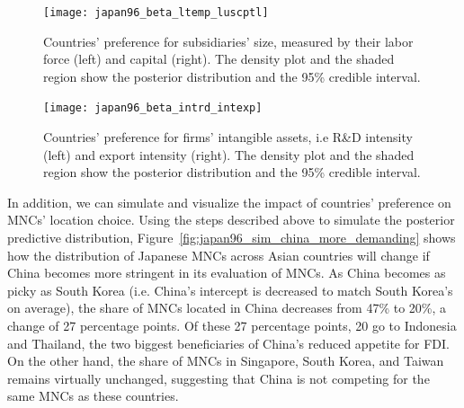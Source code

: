 \begin{figure}[tbp] \centering
  \texttt{[image: japan96\_beta\_ltemp\_luscptl]}
  \caption[Countries' preference for subsidiaries' size.]{Countries' preference
    for subsidiaries' size, measured by their labor force (left) and capital
    (right). The density plot and the shaded region show the posterior
    distribution and the 95\% credible interval.}
  \label{fig:japan96_beta_ltemp_luscptl}
\end{figure}

\begin{figure}[tbp] \centering
  \texttt{[image: japan96\_beta\_intrd\_intexp]}
  \caption[Countries' preference for firms' intangible assets.]{Countries'
    preference for firms' intangible assets, i.e R\&D intensity (left) and
    export intensity (right). The density plot and the shaded region show the
    posterior distribution and the 95\% credible interval.}
  \label{fig:japan96_beta_intrd_intexp}
\end{figure}

In addition, we can simulate and visualize the impact of countries' preference
on MNCs' location choice. Using the steps described above to simulate the
posterior predictive distribution,
Figure~\ref{fig:japan96_sim_china_more_demanding} shows how the distribution of
Japanese MNCs across Asian countries will change if China becomes more stringent
in its evaluation of MNCs. As China becomes as picky as South Korea (i.e.
China's intercept is decreased to match South Korea's on average), the share of MNCs
located in China decreases from 47\% to 20\%, a change of 27 percentage
points. Of these 27 percentage points, 20 go to Indonesia and Thailand, the two
biggest beneficiaries of China's reduced appetite for FDI. On the other hand, the
share of MNCs in Singapore, South Korea, and Taiwan remains virtually unchanged,
suggesting that China is not competing for the same MNCs as these countries.

